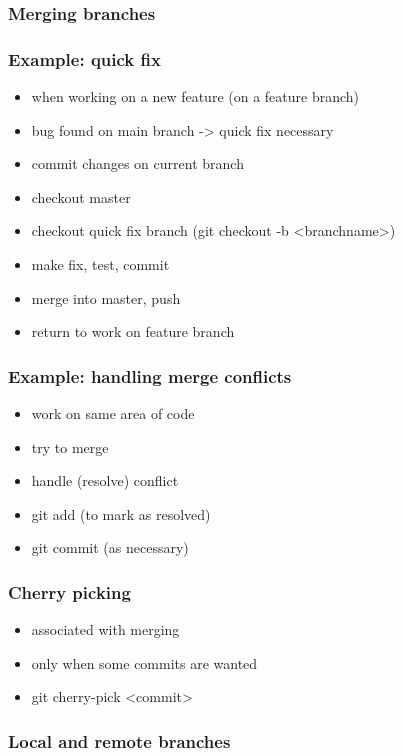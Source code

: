 \documentclass{git_course}
\begin{document}
\begin{frame}
\frametitle{Merging branches}
\begin{center}
    \resizebox{!}{0.7\textheight}{
        
    }
\end{center}
\end{frame}

\begin{frame}
\frametitle{Example: quick fix}
\begin{itemize}
    \item when working on a new feature (on a feature branch)
    \item bug found on main branch -> quick fix necessary
    \item commit changes on current branch
    \item checkout master
    \item checkout quick fix branch (git checkout -b <branchname>)
    \item make fix, test, commit
    \item merge into master, push
    \item return to work on feature branch
\end{itemize}
\end{frame}

\begin{frame}
\frametitle{Example: handling merge conflicts}
\begin{itemize}
    \item work on same area of code
    \item try to merge
    \item handle (resolve) conflict
    \item git add (to mark as resolved)
    \item git commit (as necessary)
\end{itemize}
\end{frame}

\begin{frame}
\frametitle{Cherry picking}
\begin{itemize}
    \item associated with merging
    \item only when some commits are wanted
    \item git cherry-pick <commit>
\end{itemize}
\end{frame}

\begin{frame}
\frametitle{Local and remote branches}
\end{frame}
\end{document}
